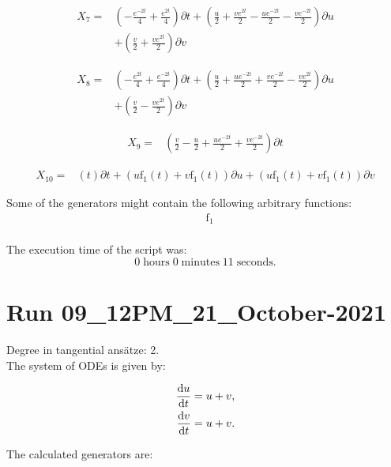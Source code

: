 \begin{align*}
X_{7}=&\left(- \frac{e^{- 2 t}}{4}+\frac{e^{2 t}}{4} \right)\partial t+\left(\frac{u}{2}+\frac{v e^{2 t}}{2}- \frac{u e^{- 2 t}}{2}- \frac{v e^{- 2 t}}{2} \right)\partial u\\
&+\left(\frac{v}{2}+\frac{v e^{2 t}}{2} \right)\partial v
\end{align*}

\begin{align*}
X_{8}=&\left(- \frac{e^{2 t}}{4}+\frac{e^{- 2 t}}{4} \right)\partial t+\left(\frac{u}{2}+\frac{u e^{- 2 t}}{2}+\frac{v e^{- 2 t}}{2}- \frac{v e^{2 t}}{2} \right)\partial u\\
&+\left(\frac{v}{2}- \frac{v e^{2 t}}{2} \right)\partial v
\end{align*}

\begin{align*}
X_{9}=&\left(\frac{v}{2}- \frac{u}{2}+\frac{u e^{- 2 t}}{2}+\frac{v e^{- 2 t}}{2} \right)\partial t
\end{align*}

\begin{align*}
X_{10}=&\left(t \right)\partial t+\left(u \operatorname{f_{1}}{\left(t \right)}+v \operatorname{f_{1}}{\left(t \right)} \right)\partial u+\left(u \operatorname{f_{1}}{\left(t \right)}+v \operatorname{f_{1}}{\left(t \right)} \right)\partial v
\end{align*}



\noindent Some of the generators might contain the following arbitrary functions:
\begin{align*}
&\operatorname{f_{1}}\\
\end{align*}

\noindent The execution time of the script was:
$$0\;\mathrm{hours}\;0\;\mathrm{minutes}\;11 \;\mathrm{seconds}.$$
\section*{Run 09\_12PM\_21\_October-2021}
Degree in tangential ansätze:	2.\\
The system of ODEs is given by:

\begin{align*}
\dv{u}{t}&=u + v,\\
\dv{v}{t}&=u + v.\\
\end{align*}

\noindent The calculated generators are:

